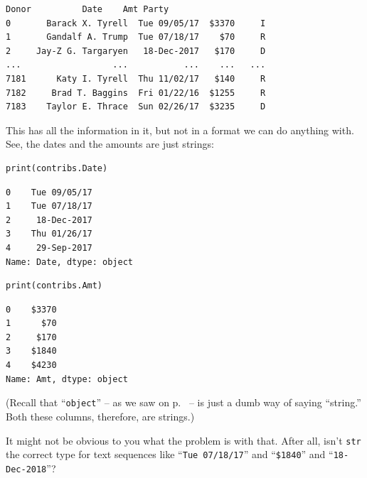 \begin{Verbatim}[fontsize=\small,samepage=true,frame=leftline,framesep=5mm,framerule=1mm]
                   Donor          Date    Amt Party
0       Barack X. Tyrell  Tue 09/05/17  $3370     I
1       Gandalf A. Trump  Tue 07/18/17    $70     R
2     Jay-Z G. Targaryen   18-Dec-2017   $170     D
...                  ...           ...    ...   ...
7181      Katy I. Tyrell  Thu 11/02/17   $140     R
7182     Brad T. Baggins  Fri 01/22/16  $1255     R
7183    Taylor E. Thrace  Sun 02/26/17  $3235     D
\end{Verbatim}

This has all the information in it, but not in a format we can do anything
with. See, the dates and the amounts are just strings:

\begin{Verbatim}[fontsize=\small,samepage=true,frame=single,framesep=3mm]
print(contribs.Date)
\end{Verbatim}
\vspace{-.2in}

\begin{Verbatim}[fontsize=\small,samepage=true,frame=leftline,framesep=5mm,framerule=1mm]
0    Tue 09/05/17
1    Tue 07/18/17
2     18-Dec-2017
3    Thu 01/26/17
4     29-Sep-2017
Name: Date, dtype: object
\end{Verbatim}

\begin{Verbatim}[fontsize=\small,samepage=true,frame=single,framesep=3mm]
print(contribs.Amt)
\end{Verbatim}
\vspace{-.2in}

\begin{Verbatim}[fontsize=\small,samepage=true,frame=leftline,framesep=5mm,framerule=1mm]
0    $3370
1      $70
2     $170
3    $1840
4    $4230
Name: Amt, dtype: object
\end{Verbatim}


(Recall that ``\texttt{object}'' -- as we saw on p.~\pageref{objectDtype} -- is
just a dumb way of saying ``string.'' Both these columns, therefore, are
strings.)

It might not be obvious to you what the problem is with that. After all, isn't
\texttt{str} the correct type for text sequences like ``\texttt{Tue 07/18/17}''
and ``\texttt{\$1840}'' and ``\texttt{18-Dec-2018}''?

